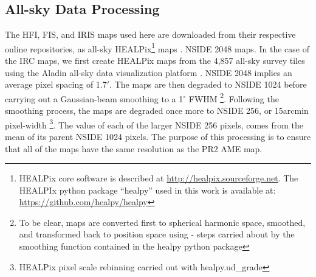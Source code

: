   \subsection{All-sky Data Processing}

        The HFI, FIS, and IRIS maps used here are downloaded from their respective online repositories, as all-sky HEALPix\footnote{HEALPix core software is described at \url{http://healpix.sourceforge.net}. The HEALPIx python package ``healpy'' used in this work is available at: \url{https://github.com/healpy/healpy}} maps \citep{gorski05}.   NSIDE 2048 maps. In the case of the IRC maps, we first create HEALPix maps from the 4,857 all-sky survey tiles using the Aladin all-sky data visualization platform \citep{bonnarel00}. NSIDE 2048 implies an average pixel spacing of 1.7$'$. The maps are then degraded to NSIDE 1024 before carrying out a Gaussian-beam smoothing to a 1$^{\circ}$ FWHM \footnote{To be clear, maps are converted first to spherical harmonic space, smoothed, and transformed back to position space using - steps carried about by the smoothing function contained in the healpy python package}. Following the smoothing process, the maps are degraded once more to NSIDE 256, or 15arcmin pixel-width \footnote{HEALPix pixel scale rebinning carried out with healpy.ud\_grade}. The value of each of the larger NSIDE 256 pixels, comes from the mean of its parent NSIDE 1024 pixels. The purpose of this processing is to ensure that all of the maps have the same resolution as the PR2 AME map.
